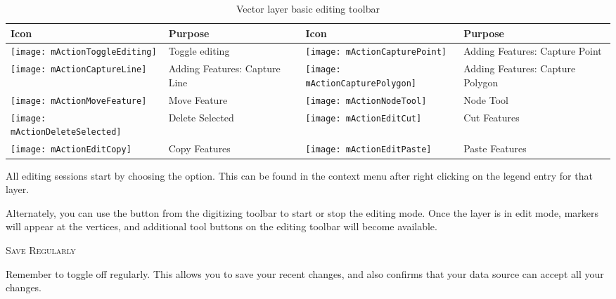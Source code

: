 \begin{table}[ht]
\centering
\begin{tabular}{|l|p{5.5cm}|l|p{5.5cm}|}
\hline \textbf{Icon} & \textbf{Purpose} & \textbf{Icon} & \textbf{Purpose} \\
\hline \texttt{[image: mActionToggleEditing]}
   & Toggle editing
   & \texttt{[image: mActionCapturePoint]}
   & Adding Features: Capture Point \\
\hline \texttt{[image: mActionCaptureLine]}
   & Adding Features: Capture Line
   & \texttt{[image: mActionCapturePolygon]}
   & Adding Features: Capture Polygon \\
\hline \texttt{[image: mActionMoveFeature]}
   & Move Feature
   & \texttt{[image: mActionNodeTool]}
   & Node Tool \\ 
\hline \texttt{[image: mActionDeleteSelected]}
   & Delete Selected
   & \texttt{[image: mActionEditCut]}
   & Cut Features \\
\hline \texttt{[image: mActionEditCopy]}
   & Copy Features
   & \texttt{[image: mActionEditPaste]} 
   & Paste Features \\
\hline
\end{tabular}
\caption{Vector layer basic editing toolbar}\label{tab:vector_editing}\medskip
\end{table}

All editing sessions start by choosing the
 option.
This can be found in the context menu after right clicking on the legend
entry for that layer.

Alternately, you can use the 
 button from the digitizing
toolbar to start or stop the editing mode. Once the
layer is in edit mode, markers will appear at the vertices, and additional
tool buttons on the editing toolbar will become available.

\begin{Tip}\caption{\textsc{Save Regularly}}
Remember to toggle 
off regularly. This allows you to save your recent changes, and also confirms
that your data source can accept all your changes.
\end{Tip}


